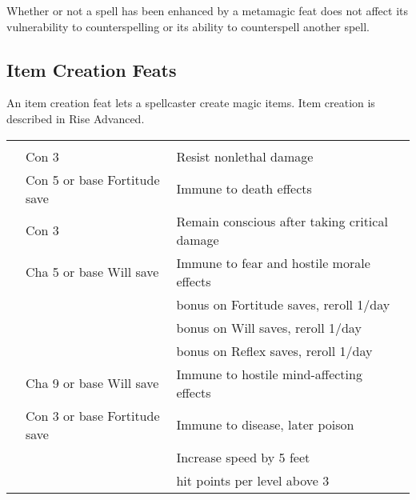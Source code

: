  Whether or not a spell has been enhanced by a metamagic feat does not affect its vulnerability to counterspelling or its ability to counterspell another spell.

\subsection{Item Creation Feats}
An item creation feat lets a spellcaster create magic items. Item creation is described in Rise Advanced.
\onecolumn

{\small
{}
\begin{longtabu}{>{\lcol}p{15em} >{\lcol}p{15em} >{\lcol}X >{\lcol}p{10em}}
 &  &  \\
 & Con 3 & Resist nonlethal damage \\
 & Con 5 or base Fortitude save  & Immune to death effects \\
 & Con 3 & Remain conscious after taking critical damage \\
 & Cha 5 or base Will save  & Immune to fear and hostile morale effects \\
 & \x &   bonus on Fortitude saves, reroll 1/day \\
 & \x &   bonus on Will saves, reroll 1/day \\
 & \x &   bonus on Reflex saves, reroll 1/day \\
 & Cha 9 or base Will save  & Immune to hostile mind-affecting effects \\
 & Con 3 or base Fortitude save  & Immune to disease, later poison \\
 & \x & Increase speed by 5 feet \\
 & \x &   hit points  per level above 3 \\


\end{longtabu}}
